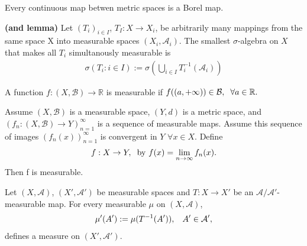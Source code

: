     \begin{corollary}
        Every continuous map betwen metric spaces is a Borel map.
    \end{corollary}

    \begin{definition}
        \textbf{(and lemma)}
        Let $(T_i)_{i\in I}$, $T_I:X\rightarrow X_i$, be arbitrarily many mappings from the same space X into measurable spaces $(X_i,\mathcal A_i).$ The smallest $\sigma$-algebra on $X$ that makes all $T_i$ simultanously measurable is 
        \begin{align*}
            \sigma(T_i:i\in I) := \sigma \left( \bigcup_{i\in I}T_i^{-1}(\mathcal A_i)\right)
        \end{align*}

    \end{definition}
	
    \begin{corollary}
        A function $f:(X,\mathcal B)\rightarrow \mathbb R$ is measurable if $f((a,+\infty))\in \mathcal B,\hspace{2mm}\forall a\in \mathbb R.$
    \end{corollary}

    \begin{corollary}
        Assume $(X,\mathcal B)$ is a measurable space, $(Y,d)$ is a metric space, and \\ $(f_n:(X,\mathcal B)\rightarrow Y)_{n=1}^\infty$ is a sequence of measurable maps.
        Assume this sequence of images $(f_n(x))_{n=1}^\infty$ is convergent in $Y$ $\forall x\in X$.
        Define \begin{align*}
            f:X\rightarrow Y,\hspace{2mm}\text{by  } f(x)=\lim_{n\rightarrow \infty} f_n(x).
        \end{align*}
        Then f is measurable.
    \end{corollary}

    \begin{theorem}
        Let $(X,\mathcal A)$, $(X',\mathcal A')$ be measurable spaces and $T:X\rightarrow X'$ be an $\mathcal A/\mathcal A'$-measurable map. For every measurable $\mu$ on $(X,\mathcal A)$, 
        \begin{align*}
            \mu'(A') := \mu (T^{-1}(A')),\hspace{3mm} A'\in \mathcal A',
        \end{align*}
        defines a measure on $(X',\mathcal A')$.
    \end{theorem}

